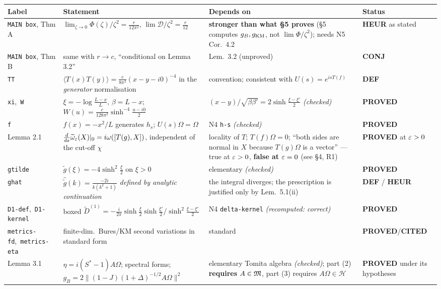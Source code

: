 \documentclass[11pt]{article}
\newcommand{\stPR}{{\color{okgreen}\textsf{\scriptsize\bfseries PROVED}}}
\newcommand{\stCIT}{{\color{navy}\textsf{\scriptsize\bfseries CITED}}}
\newcommand{\stHEU}{{\color{warn}\textsf{\scriptsize\bfseries HEUR}}}
\newcommand{\stCON}{{\color{warn}\textsf{\scriptsize\bfseries CONJ}}}
\newcommand{\stDEF}{{\textsf{\scriptsize\bfseries DEF}}}
\newcommand{\NIV}{N4}\newcommand{\NV}{N5}\newcommand{\NVI}{N6}\newcommand{\NVII}{N7}
\newcommand{\zz}{\zeta}
\newcommand{\gt}{\widetilde g}
\newcommand{\gh}{\widehat{\gt}}
\begin{document}
{\footnotesize\setlength{\emergencystretch}{4em}\sloppy{}\relax{}\relax
\begin{tabularx}{\textwidth}{L{0.155\textwidth} X L{0.210\textwidth} L{0.098\textwidth}}
\toprule
\textbf{Label} & \textbf{Statement} & \textbf{Depends on} & \textbf{Status}\\
\midrule\endhead
\texttt{MAIN box}, Thm A & $\lim_{\zz\to0}\Phi(\zz)/\zz^2=\frac r{12\pi^2}$, $\lim\mathcal D/\zz^2=\frac r{12}$ & \textbf{stronger than what \S5 proves} (\S5 computes $g_B,g_{\rm KM}$, not $\lim\Phi/\zz^2$); needs \NV{} Cor.~4.2 & \stHEU{} as stated \\
\texttt{MAIN box}, Thm B & same with $r\to c$, ``conditional on Lemma 3.2'' & Lem.~3.2 (unproved) & \stCON \\
\texttt{TT} & $\langle T(x)T(y)\rangle=\frac c{8\pi^2}(x-y-i0)^{-4}$ in the \emph{generator} normalisation & convention; consistent with $U(s)=e^{isT(f)}$ & \stDEF \\
\texttt{xi},\allowbreak\ \texttt{W} & $\xi=-\log\frac{L-x}L$, $\beta=L-x$; $W(u)=\frac c{128\pi^2}\sinh^{-4}\frac{u-i0}2$ & $(x-y)/\sqrt{\beta\beta'}=2\sinh\frac{\xi-\xi'}2$ \emph{(checked)} & \stPR \\
\texttt{f} & $f(x)=-x^2/L$ generates $h_s$; $U(s)\Omega=\Omega$ & \NIV{} \texttt{h-s} \emph{(checked)} & \stPR \\
Lemma 2.1 & $\frac d{ds}\widetilde\omega_\varepsilon(X)|_0=i\omega([T(g),X])$, independent of the cut-off $\chi$ & locality of $T$; $T(f)\Omega=0$; ``both sides are normal in $X$ because $T(g)\Omega$ is a vector'' --- true at $\varepsilon>0$, \textbf{false at $\varepsilon=0$} (see \S4, R1) & \stPR{} at $\varepsilon>0$ \\
\texttt{gtilde} & $\gt(\xi)=-4\sinh^2\frac\xi2$ on $\xi>0$ & elementary \emph{(checked)} & \stPR \\
\texttt{ghat} & $\gh(k)=\frac{-2i}{k(k^2+1)}$ \emph{defined by analytic continuation} & the integral diverges; the prescription is justified only by Lem.~5.1(ii) & \stDEF{} / \stHEU \\
\texttt{D1-def},\allowbreak\ \texttt{D1-kernel} & boxed $\widetilde D^{(1)}=-\frac i{2\pi}\sinh\frac\xi2\sinh\frac{\xi'}2/\sinh^2\frac{\xi-\xi'}2$ & \NIV{} \texttt{delta-kernel} \emph{(recomputed: correct)} & \stPR \\
\texttt{metrics-fd},\allowbreak\ \texttt{metrics-eta} & finite-dim.\ Bures/KM second variations in standard form & standard & \stPR{}/\stCIT \\
Lemma 3.1 & $\eta=i(S^*-1)A\Omega$; spectral forms; $g_B=2\|(1-J)(1+\Delta)^{-1/2}A\Omega\|^2$ & elementary Tomita algebra \emph{(checked)}; part (2) \textbf{requires $A\in\mathfrak M$}, part (3) requires $A\Omega\in\mathcal H$ & \stPR{} under its hypotheses \\

\end{tabularx}}
\end{document}
